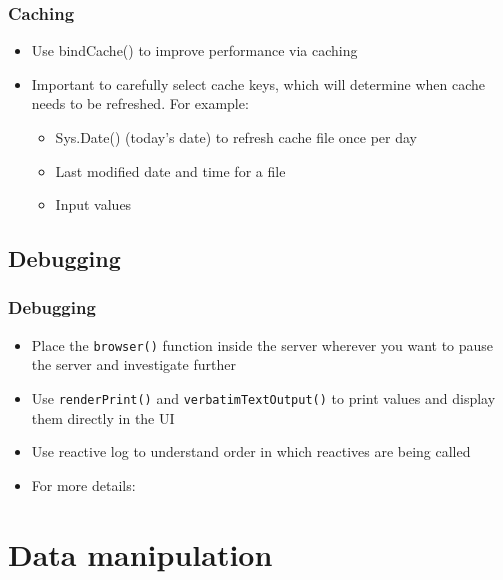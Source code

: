 \documentclass[
	11pt, %
]{beamer}
\begin{document}
\begin{frame}
	\frametitle{Caching}
	
	\begin{itemize}
		\item Use bindCache() to improve performance via caching
		\item Important to carefully select cache keys, which will determine when cache needs to be refreshed. For example:
	\begin{itemize}
		\item Sys.Date() (today's date) to refresh cache file once per day
		\item Last modified date and time for a file
		\item Input values
	\end{itemize}
	\end{itemize}
\end{frame}



\subsection{Debugging}

\begin{frame}
	\frametitle{Debugging}
	
	\begin{itemize}
	\item Place the \texttt{browser()} function inside the server wherever you want to pause the server and investigate further
	\item Use \texttt{renderPrint()} and \texttt{verbatimTextOutput()} to print values and display them directly in the UI
	\item Use reactive log to understand order in which reactives are being called
	\item For more details: \href{https://shiny.posit.co/r/articles/improve/debugging/}{\color{blue}{https://shiny.posit.co/r/articles/improve/debugging/}} 

	\end{itemize}
	
\end{frame}


\section{Data manipulation}
\end{document}
